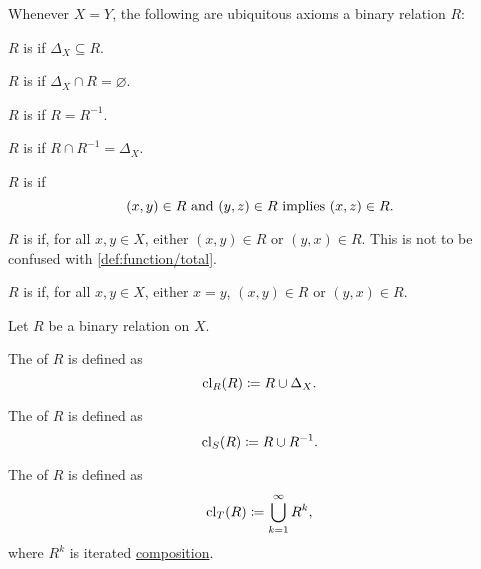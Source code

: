 \begin{definition}
  Whenever \( X = Y \), the following are ubiquitous axioms a binary relation \( R \):
  \begin{defenum}[resume=def:binary_relation]
     \( R \) is  if \( \Delta_X \subseteq R \).

     \( R \) is  if \( \Delta_X \cap R = \varnothing \).

     \( R \) is  if \( R = R^{-1} \).

     \( R \) is  if \( R \cap R^{-1} = \Delta_X \).

     \( R \) is  if
    \begin{equation*}
      (x, y) \in R \text{ and } (y, z) \in R \text{ implies } (x, z) \in R.
    \end{equation*}

     \( R \) is  if, for all \( x, y \in X \), either \( (x, y) \in R \) or \( (y, x) \in R \). This is not to be confused with \cref{def:function/total}.

     \( R \) is  if, for all \( x, y \in X \), either \( x = y \), \( (x, y) \in R \) or \( (y, x) \in R \).
  \end{defenum}
\end{definition}

\begin{definition}\label{def:derived_relations}
  Let \( R \) be a binary relation on \( X \).

  \begin{defenum}
     The  of \( R \) is defined as
    \begin{equation*}
      \operatorname{cl}_R(R) \coloneqq R \cup \Delta_X.
    \end{equation*}

     The  of \( R \) is defined as
    \begin{equation*}
      \operatorname{cl}_S(R) \coloneqq R \cup R^{-1}.
    \end{equation*}

     The  of \( R \) is defined as
    \begin{equation*}
      \operatorname{cl}_T(R) \coloneqq \bigcup_{k=1}^\infty R^k,
    \end{equation*}
    where \( R^k \) is iterated \hyperref[def:binary_relation/composition]{composition}.
  \end{defenum}
\end{definition}

